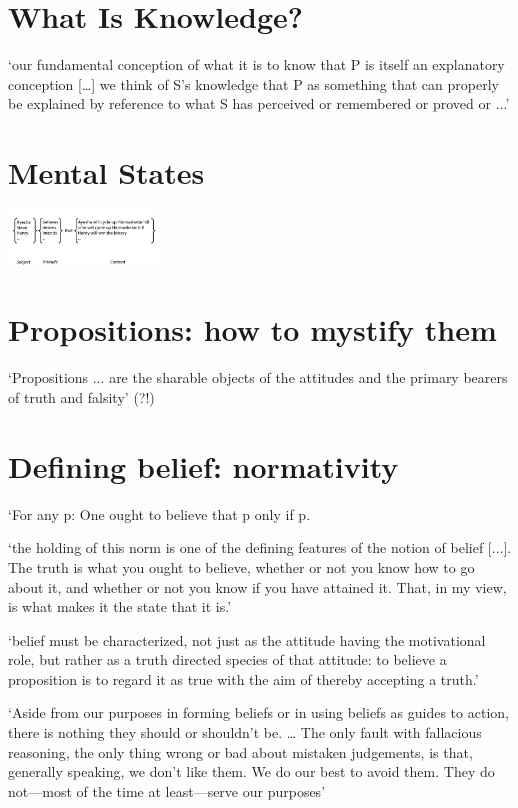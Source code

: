 \documentclass[11pt]{extarticle}
\begin{document}
\begin{multicols}{3}
\section{What Is Knowledge?}
‘our fundamental conception of what it is to know that P is itself an explanatory conception […] we think of S’s knowledge that P as something that can properly be explained by reference to what S has perceived or remembered or proved or ...’\citep{Cassam:2007ri} %


\section{Mental States}
\begin{center}
  \includegraphics[width=0.3\textwidth]{fig4n.png}
\end{center}


\section{Propositions: how to mystify them}
‘Propositions ... are the sharable objects of the attitudes and the primary bearers of truth and falsity’\citep{McGrath:2012pro} (?!)



\section{Defining belief: normativity}
‘For any p: One ought to believe that p only if p.

‘the holding of this norm is one of the defining features of the notion of belief [...]. The truth is what you ought to believe, whether or not you know how to go about it, and whether or not you know if you have attained it. That, in my view, is what makes it the state that it is.’\citep{boghossian:2003_normativity} %

`belief must be characterized, not just as the attitude having the motivational role, but rather as a truth directed species of that attitude: to believe a proposition is to regard it as true with the aim of thereby accepting a truth.'\citep{Velleman:2000fq} %

‘Aside from our purposes in forming beliefs or in using beliefs as guides to action, there is nothing they should or shouldn’t be.  …  The only fault with fallacious reasoning, the only thing wrong or bad about mistaken judgements, is that, generally speaking, we don’t like them.  We do our best to avoid them.  They do not—most of the time at least—serve our purposes’\citep{Dretske:2000ky} %


\end{multicols}
\end{document}
